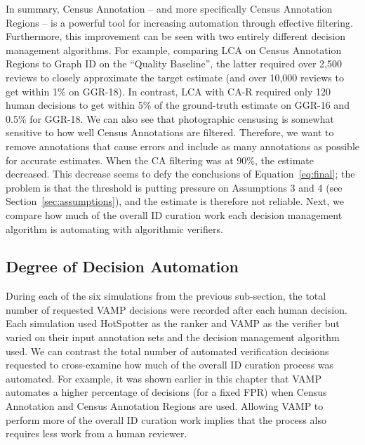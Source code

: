 In summary, Census Annotation -- and more specifically Census Annotation Regions -- is a powerful tool for increasing automation through effective filtering.  Furthermore, this improvement can be seen with two entirely different decision management algorithms.  For example, comparing LCA on Census Annotation Regions to Graph ID on the ``Quality Baseline'', the latter required over 2,500 reviews to closely approximate the target estimate (and over 10,000 reviews to get within 1\% on GGR-18).  In contrast, LCA with CA-R required only 120 human decisions to get within 5\% of the ground-truth estimate on GGR-16 and 0.5\% for GGR-18.  We can also see that photographic censusing is somewhat sensitive to how well Census Annotations are filtered. Therefore, we want to remove annotations that cause errors and include as many annotations as possible for accurate estimates.  When the CA filtering was at 90\%, the estimate decreased.  This decrease seems to defy the conclusions of Equation~\eqref{eq:final}; the problem is that the threshold is putting pressure on Assumptions 3 and 4 (see Section~\ref{sec:assumptions}), and the estimate is therefore not reliable.  Next, we compare how much of the overall ID curation work each decision management algorithm is automating with algorithmic verifiers.

\subsection{Degree of Decision Automation}

During each of the six simulations from the previous sub-section, the total number of requested VAMP decisions were recorded after each human decision.  Each simulation used HotSpotter as the ranker and VAMP as the verifier but varied on their input annotation sets and the decision management algorithm used.  We can contrast the total number of automated verification decisions requested to cross-examine how much of the overall ID curation process was automated.  For example, it was shown earlier in this chapter that VAMP automates a higher percentage of decisions (for a fixed FPR) when Census Annotation and Census Annotation Regions are used.  Allowing VAMP to perform more of the overall ID curation work implies that the process also requires less work from a human reviewer.

